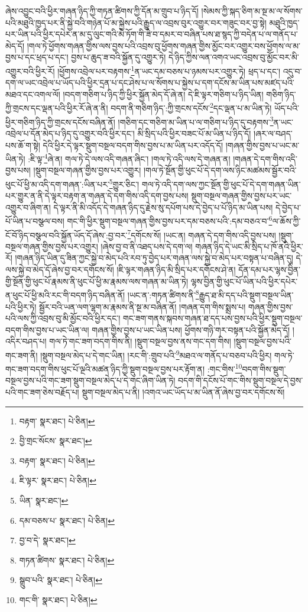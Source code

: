 ཞེས་འབྱུང་བའི་ཕྱིར་གཞན་ཉིད་ཀྱི་གཏན་ཚིགས་ཀྱི་དོན་མ་གྲུབ་པ་ཉིད་དོ། །སེམས་ཀྱི་སྐད་ཅིག་མ་སྔ་མ་ལ་སོགས་པའི་མཐུའི་ཁྱད་པར་ནི་སྐྱེ་བའི་གཉེན་པོ་མ་སྐྱེས་པའི་རྒྱུད་ལ་འབྲས་བུར་འགྱུར་བར་གཟུང་བར་བྱ་སྟེ། མཐུའི་ཁྱད་པར་ཡིན་པའི་ཕྱིར་དཔེར་ན་མ་དུ་ལུང་གའི་མེ་ཏོག་གི་ཟེ་བ་དམར་བ་བཞིན་པས་ཐ་སྙད་ཀྱི་བདེན་པ་ལ་གནོད་པ་མེད་དོ། །གལ་ཏེ་ཕྱོགས་གཞན་གྱིས་ལས་བྱས་པའི་འབྲས་བུ་ཕྱོགས་གཞན་གྱིས་མྱོང་བར་འགྱུར་བས་ཕྱོགས་ལ་མ་བྱས་པ་དང་ཕྲད་པ་དང་། བྱས་པ་ཆུད་ཟ་བའི་སྐྱོན་དུ་འགྱུར་ཏེ། དེ་ཉིད་ཀྱིས་ལན་འགའ་ཡང་འབྲས་བུ་མྱོང་བར་མི་འགྱུར་བའི་ཕྱིར་རོ། །ཕྱོགས་འབྲེལ་པར་བརྟགས་\footnote{བརྟག་  སྣར་ཐང་།  པེ་ཅིན། }ན་ཡང་དམ་བཅས་པ་ཉམས་པར་འགྱུར་ཏེ། ཕྲད་པ་དང་། འདུ་བ་དག་ལ་ཡང་འབྲེལ་པ་ཡོད་པའི་ཕྱིར་དྲན་པ་དང་ཤེས་པ་ལ་སོགས་པ་སྐྱེས་པ་དག་དངོས་མ་ཡིན་པས་མཛད་པའི་མཐའ་དང་འགལ་ལོ། །བདག་གཅིག་པ་ཉིད་ཀྱི་ཕྱིར་སྐྱོན་མེད་དོ་ཞེ་ན། དེ་ཇི་ལྟར་གཅིག་པ་ཉིད་ཡིན། གཅིག་ཉིད་ཀྱི་གྲངས་དང་ལྡན་པའི་ཕྱིར་རོ་ཞེ་ན་ནི། བདག་ནི་གཅིག་ཉིད་:ཀྱི་གྲངས་དངོས་\footnote{བྱི་གྲང་སོངས་  སྣར་ཐང་། }དང་ལྡན་པ་མ་ཡིན་ཏེ། ཡོད་པའི་ཕྱིར་གཅིག་ཉིད་ཀྱི་གྲངས་དངོས་བཞིན་ནོ། །གཅིག་དང་གཅིག་མ་ཡིན་པ་ལ་གཅིག་པ་ཉིད་དུ་བརྟགས་\footnote{བརྟག་  སྣར་ཐང་།  པེ་ཅིན། }ན་ཡང་འབྲེལ་པ་དོན་མེད་པ་ཉིད་དུ་འགྱུར་བའི་ཕྱིར་དང་། མི་སྲིད་པའི་ཕྱིར་བཟང་པོ་མ་ཡིན་པ་ཉིད་དོ། །ཞར་ལ་བཤད་པས་ཆོ་ག་སྟེ། དེའི་ཕྱིར་དེ་ལྟར་སྡུག་བསྔལ་བདག་གིས་བྱས་པ་མ་ཡིན་པར་འདོད་དོ། །གཞན་གྱིས་བྱས་པ་ཡང་མ་ཡིན་ཏེ། :ཇི་ལྟ་\footnote{ཇི་ལྟར་  སྣར་ཐང་།  པེ་ཅིན། }ཞེ་ན། གལ་ཏེ་དེ་ལས་འདི་གཞན་ཞིང་། །གལ་ཏེ་འདི་ལས་དེ་གཞན་ན། །གཞན་དེ་དག་གིས་འདི་བྱས་པས། །སྡུག་བསྔལ་གཞན་གྱིས་བྱས་པར་འགྱུར། །གལ་ཏེ་སྔོན་གྱི་ཕུང་པོ་དེ་དག་ལས་ཉིང་མཚམས་སྦྱོར་བའི་ཕུང་པོ་ཕྱི་མ་འདི་དག་གཞན་:ཡིན་པར་\footnote{ཡིན་  སྣར་ཐང་། }གྱུར་ཅིང་། གལ་ཏེ་འདི་དག་ལས་ཀྱང་སྔོན་གྱི་ཕུང་པོ་དེ་དག་གཞན་ཡིན་པར་གྱུར་ན་ནི་དེ་ལྟར་བརྟག་ན་གཞན་དེ་དག་གིས་འདི་དག་བྱས་པས། སྡུག་བསྔལ་གཞན་གྱིས་བྱས་པར་ཡང་འགྱུར་བ་ཞིག་ན། དེ་ལྟར་ནི་མི་འདོད་དེ་གཞན་ཉིད་དུ་རྗེས་སུ་དཔོག་པས་དེ་བྱེད་པ་པོ་ཉིད་མ་ཡིན་པས། དེ་བྱེད་པ་པོ་ཡིན་པ་བསྩལ་བས། གང་གི་ཕྱིར་སྡུག་བསྔལ་གཞན་གྱིས་བྱས་པར་དམ་བཅས་པའི་:དམ་བཅའ་བ་\footnote{དམ་བཅས་པ་  སྣར་ཐང་།  པེ་ཅིན། }ལ་ཆོས་ཀྱི་ངོ་བོ་ཉིད་བསྩལ་བའི་སྐྱོན་ཡོད་དོ་ཞེས་:བྱ་བར་\footnote{བྱ་བ་དེ་  སྣར་ཐང་། }དགོངས་སོ། །ཡང་ན། གཞན་དེ་དག་གིས་འདི་བྱས་པས། །སྡུག་བསྔལ་གཞན་གྱིས་བྱས་པར་འགྱུར། །ཞེས་བྱ་བ་ནི་འཐད་པས་དེ་དག་ལ། གཞན་ཉིད་དེ་ཡང་མི་སྲིད་པ་ཁོ་ནའི་ཕྱིར་རོ། །གཞན་ཉིད་ཡིན་དུ་ཟིན་ཀྱང་སྐྱེ་བ་མེད་པའི་རབ་ཏུ་བྱེད་པར་གཞན་ལས་སྐྱེ་བ་མེད་པར་བསྟན་པ་བཞིན་དུ། དེ་ལས་སྐྱེ་བ་མེད་དོ་ཞེས་བྱ་བར་དགོངས་སོ། །ཇི་ལྟར་གཞན་ཉིད་མི་སྲིད་པར་དགོངས་ཤེ་ན། དོན་དམ་པར་ལྷས་བྱིན་གྱི་སྔོན་གྱི་ཕུང་པོ་རྣམས་ནི་ཕུང་པོ་ཕྱི་མ་རྣམས་ལས་གཞན་མ་ཡིན་ཏེ། ལྷས་བྱིན་གྱི་ཕུང་པོ་ཡིན་པའི་ཕྱིར་དཔེར་ན་ཕུང་པོ་ཕྱི་མའི་རང་གི་བདག་ཉིད་བཞིན་ནོ། །ཡང་ན་:གཏན་ཚིགས་ནི་\footnote{གཏན་ཚིགས་  སྣར་ཐང་།  པེ་ཅིན། }རྒྱུད་ཐ་མི་དད་པའི་སྡུག་བསྔལ་ཡིན་པའི་ཕྱིར་ཏེ། སྦྱོར་བའི་ཡན་ལག་ལྷག་མ་རྣམས་ནི་སྔ་མ་བཞིན་ནོ། །གཞན་དག་གིས་སྨྲས་པ། གཞན་གྱིས་བྱས་པའི་ལས་ཀྱི་འབྲས་བུ་མི་མྱོང་བའི་ཕྱིར་དང་། གང་ཟག་གནས་སྐབས་གཞན་ཐ་དད་པས་བྱས་པའི་ཕྱིར་སྡུག་བསྔལ་བདག་གིས་བྱས་པ་ཡང་ཡིན་ལ། གཞན་གྱིས་བྱས་པ་ཡང་ཡིན་པས། ཕྱོགས་གཉི་གར་བསྟན་པའི་སྐྱོན་མེད་དོ། །འདིར་བཤད་པ། གལ་ཏེ་གང་ཟག་བདག་གིས་ནི། །སྡུག་བསྔལ་བྱས་ནས་གང་དག་གིས། །སྡུག་བསྔལ་བྱས་པའི་གང་ཟག་ནི། །སྡུག་བསྔལ་མེད་པ་དེ་གང་ཡིན། །རང་གི་:གྲུབ་པའི་\footnote{སྒྲུབ་པའི་  སྣར་ཐང་།  པེ་ཅིན། }མཐའ་ལ་གནོད་པ་བཅབ་པའི་ཕྱིར། གལ་ཏེ་གང་ཟག་བདག་གིས་ཕུང་པོ་ལྔའི་མཚན་ཉིད་ཀྱི་སྡུག་བསྔལ་བྱས་པར་རྟོག་ན། :གང་གིས་\footnote{གང་གི་  སྣར་ཐང་།  པེ་ཅིན། }བདག་གིས་སྡུག་བསྔལ་བྱས་པའི་གང་ཟག་སྡུག་བསྔལ་མེད་པ་དེ་གང་ཞིག་ཡིན་ཏེ། བདག་གི་དངོས་པོ་གང་གིས་སྡུག་བསྔལ་དེ་བྱས་པའི་གང་ཟག་ཅེས་བརྗོད་པ། སྡུག་བསྔལ་མེད་པ་ནི། །འགའ་ཡང་ཡོད་པ་མ་ཡིན་ནོ་ཞེས་བྱ་བར་དགོངས་སོ། 